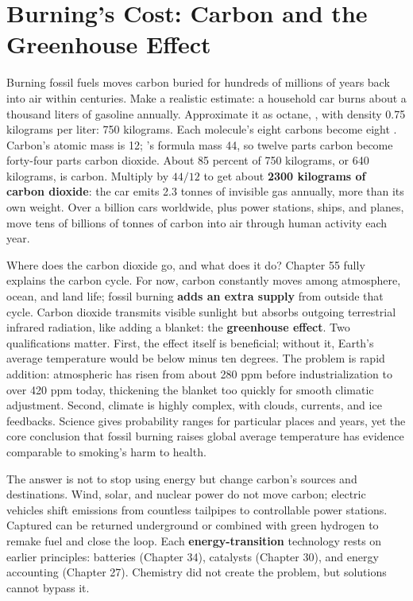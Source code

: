 \section{Burning's Cost: Carbon and the Greenhouse Effect}

Burning fossil fuels moves carbon buried for hundreds of millions of years back into air within centuries. Make a realistic estimate: a household car burns about a thousand liters of gasoline annually. Approximate it as octane, , with density 0.75 kilograms per liter: 750 kilograms. Each molecule's eight carbons become eight . Carbon's atomic mass is 12; 's formula mass 44, so twelve parts carbon become forty-four parts carbon dioxide. About 85 percent of 750 kilograms, or 640 kilograms, is carbon. Multiply by $44/12$ to get about \textbf{2300 kilograms of carbon dioxide}: the car emits 2.3 tonnes of invisible gas annually, more than its own weight. Over a billion cars worldwide, plus power stations, ships, and planes, move tens of billions of tonnes of carbon into air through human activity each year.

Where does the carbon dioxide go, and what does it do? Chapter 55 fully explains the carbon cycle. For now, carbon constantly moves among atmosphere, ocean, and land life; fossil burning \textbf{adds an extra supply} from outside that cycle. Carbon dioxide transmits visible sunlight but absorbs outgoing terrestrial infrared radiation, like adding a blanket: the \textbf{greenhouse effect}. Two qualifications matter. First, the effect itself is beneficial; without it, Earth's average temperature would be below minus ten degrees. The problem is rapid addition: atmospheric  has risen from about 280 ppm before industrialization to over 420 ppm today, thickening the blanket too quickly for smooth climatic adjustment. Second, climate is highly complex, with clouds, currents, and ice feedbacks. Science gives probability ranges for particular places and years, yet the core conclusion that fossil burning raises global average temperature has evidence comparable to smoking's harm to health.

The answer is not to stop using energy but change carbon's sources and destinations. Wind, solar, and nuclear power do not move carbon; electric vehicles shift emissions from countless tailpipes to controllable power stations. Captured  can be returned underground or combined with green hydrogen to remake fuel and close the loop. Each \textbf{energy-transition} technology rests on earlier principles: batteries (Chapter 34), catalysts (Chapter 30), and energy accounting (Chapter 27). Chemistry did not create the problem, but solutions cannot bypass it.

